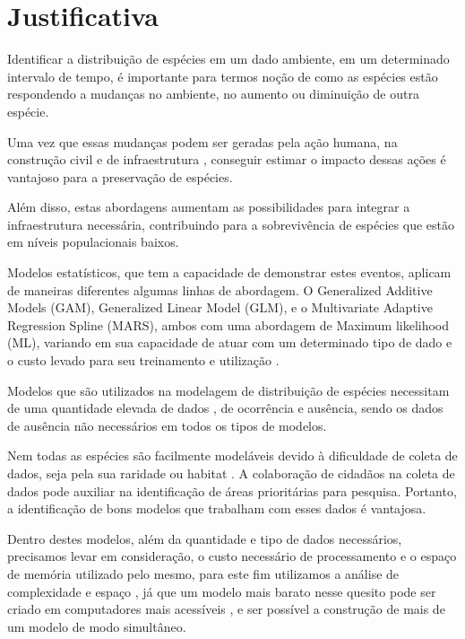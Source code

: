 \documentclass[
	12pt,				%
	openright,			%
	oneside,			%
	a4paper,			%
	english,			%
	brazil				%
	]{abntex2}
\begin{document}
\section{Justificativa}

Identificar a distribuição de espécies em um dado ambiente, em um determinado intervalo de tempo, 
é importante para termos noção de como as espécies estão respondendo a mudanças no ambiente, no aumento 
ou diminuição de outra espécie.

Uma vez que essas mudanças podem ser geradas pela ação humana, na construção civil e de infraestrutura 
\cite{impactConstruction}, conseguir estimar o impacto dessas ações é vantajoso para a preservação de espécies.

Além disso, estas abordagens aumentam as possibilidades para integrar a infraestrutura necessária, 
contribuindo para a sobrevivência de espécies que estão em níveis populacionais baixos.

Modelos estatísticos, que tem a capacidade de demonstrar estes eventos, aplicam de maneiras diferentes algumas 
linhas de abordagem. O Generalized Additive Models (GAM), Generalized Linear Model (GLM), e o 
Multivariate Adaptive Regression Spline (MARS), ambos com uma abordagem de Maximum likelihood (ML), 
variando em sua capacidade de atuar com um determinado tipo de dado e o custo levado para seu treinamento 
e utilização \cite{predPerform33models}.

Modelos que são utilizados na modelagem de distribuição de espécies necessitam de uma quantidade elevada de dados 
\cite{sampleSize}, de ocorrência e ausência, sendo os dados de ausência não necessários em todos os tipos de modelos.

Nem todas as espécies são facilmente modeláveis devido à dificuldade de coleta de dados, seja pela sua raridade ou habitat 
\cite{especiesDificies}. A colaboração de cidadãos na coleta de dados pode auxiliar na identificação de áreas prioritárias 
para pesquisa. Portanto, a identificação de bons modelos que trabalham com esses dados é vantajosa.

Dentro destes modelos, além da quantidade e tipo de dados necessários, precisamos levar em consideração, o custo necessário de 
processamento e o espaço de memória utilizado pelo mesmo, para este fim utilizamos a análise de complexidade 
e espaço \cite{introductionAlgorthms}, já que um modelo mais barato nesse quesito pode ser criado em computadores 
mais acessíveis \cite{introductionAnalysis}, e ser possível a construção de mais de um modelo de modo simultâneo.
\end{document}
